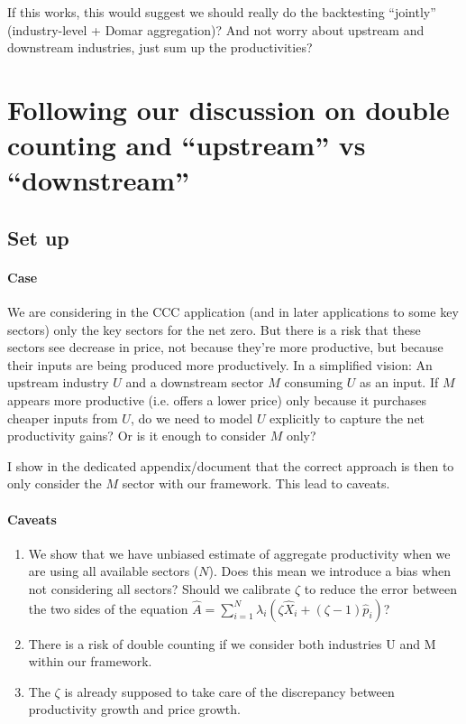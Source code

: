 \documentclass[11pt]{article}
\begin{document}
If this works, this would suggest we should really do the backtesting ``jointly'' (industry-level + Domar aggregation)? And not worry about upstream and downstream industries, just sum up the productivities?



\section{Following our discussion on double counting and ``upstream'' vs ``downstream''}

\subsection{Set up}


\paragraph{Case} We are considering in the CCC application (and in later applications to some key sectors) only the key sectors for the net zero. 
But there is a risk that these sectors see decrease in price, not because they're more productive, but because their inputs are being produced more productively.
In a simplified vision:  An upstream industry $U$ and a downstream sector $M$ consuming $U$ as an input. If $M$ appears more productive (i.e. offers a lower price) only because it purchases cheaper inputs from $U$, do we need to model $U$ explicitly to capture the net productivity gains? Or is it enough to consider $M$ only?

I show in the dedicated appendix/document that the correct approach is then to only consider the $M$ sector with our framework. This lead to caveats.


\paragraph{Caveats} 
\begin{enumerate}
    \item We show that we have unbiased estimate of aggregate productivity when we are using all available sectors ($N$). Does this mean we introduce a bias when not considering all sectors? Should we calibrate $\zeta$ to reduce the error between the two sides of the equation $ \hat{A}=\sum_{i=1}^N\lambda_i (\zeta\hat{X}_i+(\zeta-1)\hat{p}_i)$?
    \item There is a risk of double counting if we consider both industries U and M within our framework.
    \item The $\zeta$ is already supposed to take care of the discrepancy between productivity growth and price growth. 
\end{enumerate}
\end{document}
